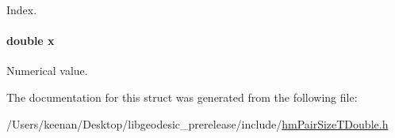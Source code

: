 Index. 

\hypertarget{structhm_pair_size_t_double_af88b946fb90d5f08b5fb740c70e98c10}{
\paragraph[{x}]{\setlength{\rightskip}{0pt plus 5cm}double x}}\label{structhm_pair_size_t_double_af88b946fb90d5f08b5fb740c70e98c10}


Numerical value. 



The documentation for this struct was generated from the following file\-:\begin{DoxyCompactItemize}
\item 
/\-Users/keenan/\-Desktop/libgeodesic\-\_\-prerelease/include/\hyperlink{hm_pair_size_t_double_8h}{hm\-Pair\-Size\-T\-Double.\-h}\end{DoxyCompactItemize}
